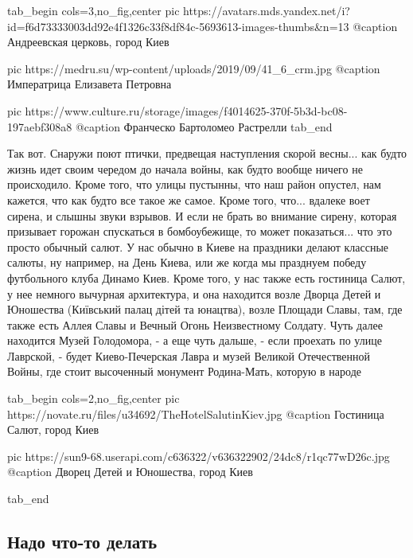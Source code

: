 \ifcmt
  tab_begin cols=3,no_fig,center
     pic https://avatars.mds.yandex.net/i?id=f6d73333003dd92e4f1326c33f8df84c-5693613-images-thumbs&n=13
		 @caption Андреевская церковь, город Киев

		 pic https://medru.su/wp-content/uploads/2019/09/41_6_crm.jpg
		 @caption Императрица Елизавета Петровна

		 pic https://www.culture.ru/storage/images/f4014625-370f-5b3d-bc08-197aebf308a8
		 @caption Франческо Бартоломео Растрелли
  tab_end
\fi

Так вот. Снаружи поют птички, предвещая наступления скорой весны... как будто
жизнь идет своим чередом до начала войны, как будто вообще ничего не
происходило. Кроме того, что улицы пустынны, что наш район опустел, нам
кажется, что как будто все такое же самое. Кроме того, что... вдалеке воет
сирена, и слышны звуки взрывов.  И если не брать во внимание сирену, которая
призывает горожан спускаться в бомбоубежище, то может показаться... что это
просто обычный салют. У нас обычно в Киеве на праздники делают классные салюты,
ну например, на День Киева, или же когда мы празднуем победу футбольного клуба
Динамо Киев. Кроме того, у нас также есть гостиница Салют, у нее немного
вычурная архитектура, и она находится возле Дворца Детей и Юношества (Київський
палац дітей та юнацтва), возле Площади Славы, там, где также есть Аллея Славы и
Вечный Огонь Неизвестному Солдату. Чуть далее находится Музей Голодомора, - а
еще чуть дальше, - если проехать по улице Лаврской, - будет Киево-Печерская
Лавра и музей Великой Отечественной Войны, где стоит высоченный монумент Родина-Мать, которую в народе

\ifcmt
  tab_begin cols=2,no_fig,center
		 pic https://novate.ru/files/u34692/TheHotelSalutinKiev.jpg
		 @caption Гостиница Салют, город Киев

		 pic https://sun9-68.userapi.com/c636322/v636322902/24dc8/r1qc77wD26c.jpg
		 @caption Дворец Детей и Юношества, город Киев

  tab_end
\fi

\subsection{Надо что-то делать}

